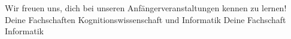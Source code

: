 Wir freuen uns, dich bei unseren Anfängerveranstaltungen kennen zu lernen!\\
\ifkogwiss
Deine Fachschaften Kognitionswissenschaft und Informatik
\else
Deine Fachschaft Informatik
\fi
\vfill

